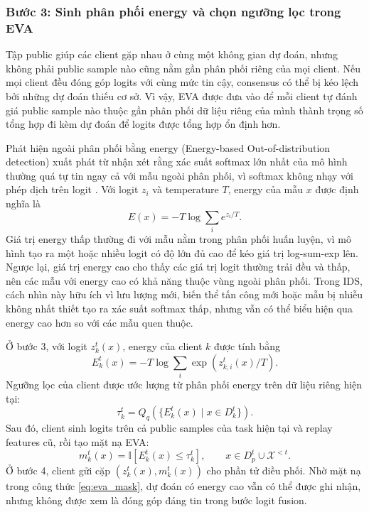 \subsubsection{Bước 3: Sinh phân phối energy và chọn ngưỡng lọc trong EVA}

Tập public giúp các client gặp nhau ở cùng một không gian dự đoán, nhưng không phải public sample nào cũng nằm gần phân phối riêng của mọi client. Nếu mọi client đều đóng góp logits với cùng mức tin cậy, consensus có thể bị kéo lệch bởi những dự đoán thiếu cơ sở. Vì vậy, EVA được đưa vào để mỗi client tự đánh giá public sample nào thuộc gần phân phối dữ liệu riêng của mình thành trọng số tổng hợp đi kèm dự đoán để logits được tổng hợp ổn định hơn.

Phát hiện ngoài phân phối bằng energy (Energy-based Out-of-distribution detection) xuất phát từ nhận xét rằng xác suất softmax lớn nhất của mô hình thường quá tự tin ngay cả với mẫu ngoài phân phối, vì softmax không nhạy với phép dịch trên logit \cite{liu2020energy}. Với logit $z_i$ và temperature $T$, energy của mẫu $x$ được định nghĩa là
\begin{equation}
\label{eq:energy_general}
E(x) = -T\log\sum_i e^{z_i/T}.
\end{equation}
Giá trị energy thấp thường đi với mẫu nằm trong phân phối huấn luyện, vì mô hình tạo ra một hoặc nhiều logit có độ lớn đủ cao để kéo giá trị log-sum-exp lên. Ngược lại, giá trị energy cao cho thấy các giá trị logit thường trải đều và thấp, nên các mẫu với energy cao có khả năng thuộc vùng ngoài phân phối. Trong IDS, cách nhìn này hữu ích vì lưu lượng mới, biến thể tấn công mới hoặc mẫu bị nhiễu không nhất thiết tạo ra xác suất softmax thấp, nhưng vẫn có thể biểu hiện qua energy cao hơn so với các mẫu quen thuộc.

Ở bước 3, với logit $z_k^t(x)$, energy của client $k$ được tính bằng
\begin{equation}
\label{eq:client_energy}
E_k^t(x)=-T\log\sum_i\exp(z_{k,i}^t(x)/T).
\end{equation}
Ngưỡng lọc của client được ước lượng từ phân phối energy trên dữ liệu riêng hiện tại:
\begin{equation}
\label{eq:eva_threshold}
\tau_k^t=Q_q(\{E_k^t(x)\mid x\in D_k^t\}).
\end{equation}
Sau đó, client sinh logits trên cả public samples của task hiện tại và replay features cũ, rồi tạo mặt nạ EVA:
\begin{equation}
\label{eq:eva_mask}
m_k^t(x)=\mathbb{I}[E_k^t(x)\leq\tau_k^t],\qquad x\in D_p^t\cup\mathcal X^{<t}.
\end{equation}
Ở bước 4, client gửi cặp $(z_k^t(x),m_k^t(x))$ cho phần tử điều phối. Nhờ mặt nạ trong công thức \ref{eq:eva_mask}, dự đoán có energy cao vẫn có thể được ghi nhận, nhưng không được xem là đóng góp đáng tin trong bước logit fusion.

